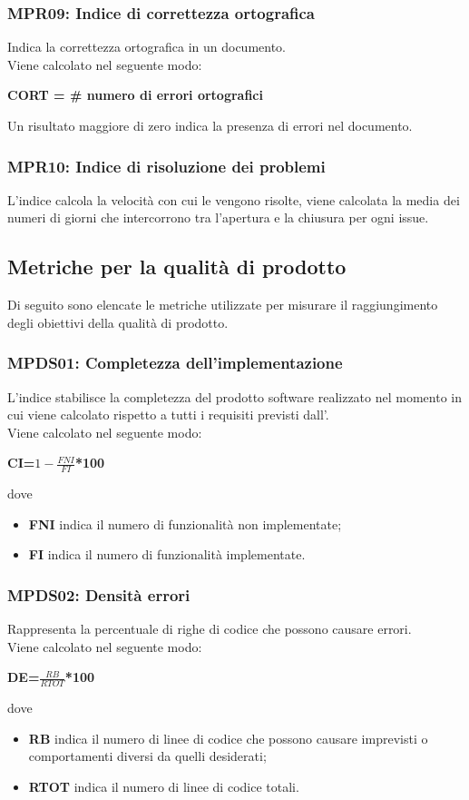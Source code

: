 \subsubsection{MPR09: Indice di correttezza ortografica}
Indica la correttezza ortografica in un documento.\\
Viene calcolato nel seguente modo:
\begin{center}
	\textbf{CORT = \# numero di errori ortografici}
\end{center}
Un risultato maggiore di zero indica la presenza di errori nel documento.
\subsubsection{MPR10: Indice di risoluzione dei problemi}
L'indice calcola la velocità con cui le  vengono risolte, viene calcolata la media dei numeri di giorni che intercorrono tra l'apertura e la chiusura per ogni issue.

\subsection{Metriche per la qualità di prodotto}
Di seguito sono elencate le metriche utilizzate per misurare il raggiungimento degli obiettivi della qualità di prodotto.
\subsubsection{MPDS01: Completezza dell'implementazione}
L'indice stabilisce la completezza del prodotto software realizzato nel momento in cui viene calcolato rispetto a tutti i requisiti previsti dall'.\\
Viene calcolato nel seguente modo:
\begin{center}
	\textbf{CI=\(1-\frac{FNI}{FI}\)*100}
\end{center}
dove
\begin{itemize}
	\item \textbf{FNI} indica il numero di funzionalità non implementate;
	\item \textbf{FI} indica il numero di funzionalità implementate.
\end{itemize}
\subsubsection{MPDS02: Densità errori}
Rappresenta la percentuale di righe di codice che possono causare errori.\\
Viene calcolato nel seguente modo:
\begin{center}
	\textbf{DE=\(\frac{RB}{RTOT}\)*100}
\end{center}
dove
\begin{itemize}
	\item \textbf{RB} indica il numero di linee di codice che possono causare imprevisti o comportamenti diversi da quelli desiderati;
	\item \textbf{RTOT} indica il numero di linee di codice totali.
\end{itemize}
